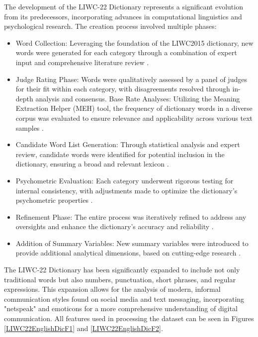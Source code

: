 The development of the LIWC-22 Dictionary represents a significant evolution from its predecessors, incorporating advances in computational linguistics and psychological research. The creation process involved multiple phases:
\begin{itemize}
\item Word Collection: Leveraging the foundation of the LIWC2015 dictionary, new words were generated for each category through a combination of expert input and comprehensive literature review \cite{boyd2022development}.
\item Judge Rating Phase: Words were qualitatively assessed by a panel of judges for their fit within each category, with disagreements resolved through in-depth analysis and consensus.
Base Rate Analyses: Utilizing the Meaning Extraction Helper (MEH) tool, the frequency of dictionary words in a diverse corpus was evaluated to ensure relevance and applicability across various text samples \cite{boyd2022development}.
\item Candidate Word List Generation: Through statistical analysis and expert review, candidate words were identified for potential inclusion in the dictionary, ensuring a broad and relevant lexicon \cite{boyd2022development}.
\item Psychometric Evaluation: Each category underwent rigorous testing for internal consistency, with adjustments made to optimize the dictionary's psychometric properties \cite{boyd2022development}.
\item Refinement Phase: The entire process was iteratively refined to address any oversights and enhance the dictionary's accuracy and reliability \cite{boyd2022development}.
\item Addition of Summary Variables: New summary variables were introduced to provide additional analytical dimensions, based on cutting-edge research \cite{boyd2022development}.
\end{itemize}

The LIWC-22 Dictionary has been significantly expanded to include not only traditional words but also numbers, punctuation, short phrases, and regular expressions. This expansion allows for the analysis of modern, informal communication styles found on social media and text messaging, incorporating "netspeak" and emoticons for a more comprehensive understanding of digital communication. All features used in processing the dataset can be seen in Figures \ref{LIWC22EnglishDicF1} and \ref{LIWC22EnglishDicF2}.

